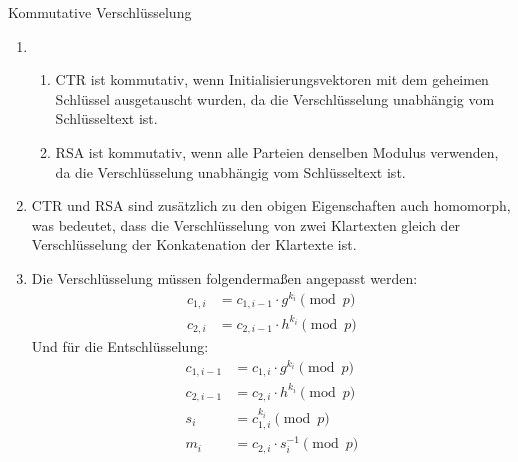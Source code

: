 \documentclass{article}
\begin{document}
\begin{exercise}{Kommutative Verschlüsselung}
  \begin{solution}
    \begin{enumerate}
      \item
      \begin{enumerate}
        \item CTR ist kommutativ, wenn Initialisierungsvektoren mit dem geheimen Schlüssel ausgetauscht wurden, da die Verschlüsselung unabhängig vom Schlüsseltext ist.
        \item RSA ist kommutativ, wenn alle Parteien denselben Modulus verwenden, da die Verschlüsselung unabhängig vom Schlüsseltext ist.
      \end{enumerate}
      \item CTR und RSA sind zusätzlich zu den obigen Eigenschaften auch homomorph, was bedeutet, dass die Verschlüsselung von zwei Klartexten gleich der Verschlüsselung der Konkatenation der Klartexte ist.
      \item Die Verschlüsselung müssen folgendermaßen angepasst werden:
        \begin{align*}
          c_{1,i}&=c_{1,i-1}\cdot g^{k_i}\pmod{p} \\
          c_{2,i}&=c_{2,i-1}\cdot h^{k_i} \pmod{p}
        \end{align*}
        Und für die Entschlüsselung:
        \begin{align*}
          c_{1,i-1}&=c_{1,i}\cdot g^{k_i} \pmod{p} \\
          c_{2,i-1}&=c_{2,i}\cdot h^{k_i} \pmod{p} \\
          s_i&=c_{1,i}^{k_i} \pmod{p} \\
          m_i&=c_{2,i}\cdot s_i^{-1} \pmod{p}
        \end{align*}
    \end{enumerate}
  \end{solution}
\end{exercise}
\end{document}
